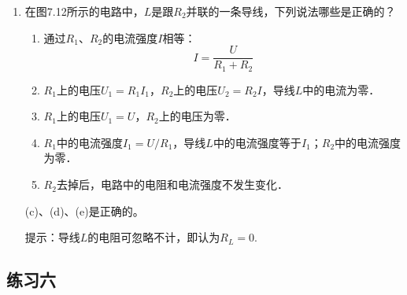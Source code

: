 \begin{enumerate}
    \item 在图7.12所示的电路中，$L$是跟$R_2$并联的一条导线，下列说法哪些是正确的？

    
    \begin{enumerate}
        \item 通过$R_1$、$R_2$的电流强度$I$相等：
        \[I=\frac{U}{R_1+R_2} \]
        \item $R_1$上的电压$U_1=R_1I_1$，$R_2$上的电压$U_2=R_2I$，导线$L$中的电流为零．
        \item $R_1$上的电压$U_1=U$，$R_2$上的电压为零．
        \item $R_1$中的电流强度$I_1=U/R_1$，导线$L$中的电流强度等于$I_1$；$R_2$中的电流强度为零．
\item $R_2$去掉后，电路中的电阻和电流强度不发生变化．
    \end{enumerate}

    \begin{solution}
(c)、(d)、(e)是正确的。

提示：导线$L$的电阻可忽略不计，即认为$R_L=0$.
    \end{solution}
\end{enumerate}



\subsection{练习六}

